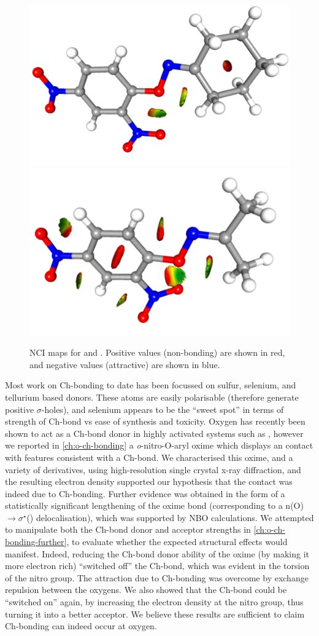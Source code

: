 \begin{refsection}
\begin{figure}
	\centering
	\includegraphics[angle=90,width=0.35\columnwidth]{Figures/cyclohexanone-oxime-dnp-nci.pdf}
	\includegraphics[angle=90,width=0.35\columnwidth]{Figures/acetone-oxime-dnp-nci.pdf}
	\caption[NCI maps for  and .]{NCI maps for  and . Positive values (non-bonding) are shown in red, and negative values (attractive) are shown in blue.}
\end{figure}

Most work on Ch-bonding to date has been focussed on sulfur, selenium, and tellurium based donors.
These atoms are easily polarisable (therefore generate positive $\sigma$-holes), and selenium appears to be the ``sweet spot'' in terms of strength of Ch-bond vs ease of synthesis and toxicity.
Oxygen has recently been shown to act as a Ch-bond donor in highly activated systems such as , however we reported in \cref{ch:o-ch-bonding} a \textit{o}-nitro-O-aryl oxime which displays an  contact with features consistent with a Ch-bond.
We characterised this oxime, and a variety of derivatives, using high-resolution single crystal x-ray diffraction, and the resulting electron density supported our hypothesis that the contact was indeed due to Ch-bonding.
Further evidence was obtained in the form of a statistically significant lengthening of the  oxime bond (corresponding to a n(O)$ \rightarrow \sigma^{\star} $() delocalisation), which was supported by NBO calculations.
We attempted to manipulate both the Ch-bond donor and acceptor strengths in \cref{ch:o-ch-bonding-further}, to evaluate whether the expected structural effects would manifest.
Indeed, reducing the Ch-bond donor ability of the oxime (by making it more electron rich) ``switched off'' the Ch-bond, which was evident in the torsion of the nitro group.
The attraction due to Ch-bonding was overcome by exchange repulsion between the oxygens.
We also showed that the Ch-bond could be ``switched on'' again, by increasing the electron density at the nitro group, thus turning it into a better acceptor.
We believe these results are sufficient to claim Ch-bonding can indeed occur at oxygen.


\end{refsection}
